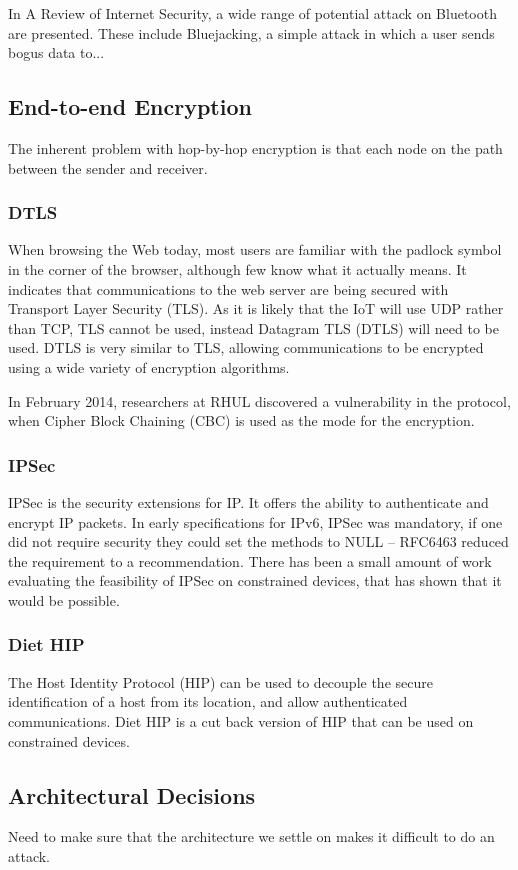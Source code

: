 \documentclass[10pt,journal,compsoc]{IEEEtran}
\begin{document}
In A Review of Internet Security, a wide range of potential attack on Bluetooth
are presented. These include Bluejacking, a simple attack in which a user sends
bogus data to... 


\subsection{End-to-end Encryption}
The inherent problem with hop-by-hop encryption is that each node on the path
between the sender and receiver.   

\subsubsection{DTLS}
When browsing the Web today, most users are familiar with the padlock symbol in
the corner of the browser, although few know what it actually means. It
indicates that communications to the web server are being secured with
Transport Layer Security (TLS). As it is likely that the IoT will use UDP
rather than TCP, TLS cannot be used, instead Datagram TLS (DTLS) will need to
be used. DTLS is very similar to TLS, allowing communications to be encrypted
using a wide variety of encryption algorithms.  

In February 2014, researchers at RHUL discovered a vulnerability in the
protocol, when Cipher Block Chaining (CBC) is used as the mode for the
encryption. 


\subsubsection{IPSec}
IPSec is the security extensions for IP. It offers the ability to authenticate
and encrypt IP packets. In early specifications for IPv6, IPSec was mandatory,
if one did not require security they could set the methods to NULL -- RFC6463
reduced the requirement to a recommendation. There has been a small amount
of work evaluating the feasibility of IPSec on constrained devices, that
has shown that it would be possible. 

\subsubsection{Diet HIP}
The Host Identity Protocol (HIP) can be used to decouple the secure
identification of a host from its location, and allow authenticated
communications. Diet HIP is a cut back version of HIP that can be used on
constrained devices. 

\subsection{Architectural Decisions}
Need to make sure that the architecture we settle on makes it difficult to do an attack. 
\end{document}
